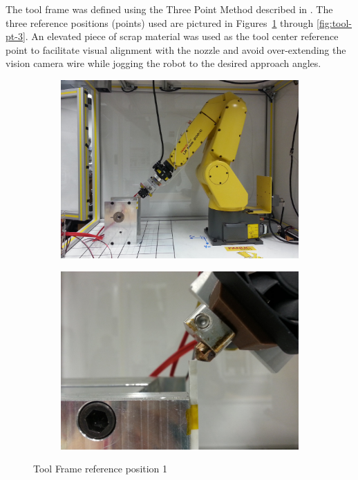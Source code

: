 The tool frame was defined using the Three Point Method described in \cite[sec~3.9.1]{lr-handling-tool}. The three reference positions (points) used are pictured in Figures~\ref{fig:tool-pt-1} through \ref{fig:tool-pt-3}. An elevated piece of scrap material was used as the tool center reference point to facilitate visual alignment with the nozzle and avoid over-extending the vision camera wire while jogging the robot to the desired approach angles.

\begin{figure}
    \centering
    \begin{subfigure}{.5\textwidth}
        \centering
            \includegraphics[width=.8\linewidth]{figures/tool-pt-1}
    \end{subfigure}%
    \begin{subfigure}{.5\textwidth}
        \centering
        \includegraphics[width=.8\linewidth]{figures/tool-pt-1-close}
    \end{subfigure}
    \caption{Tool Frame reference position 1}
    \label{fig:tool-pt-1}
\end{figure}

